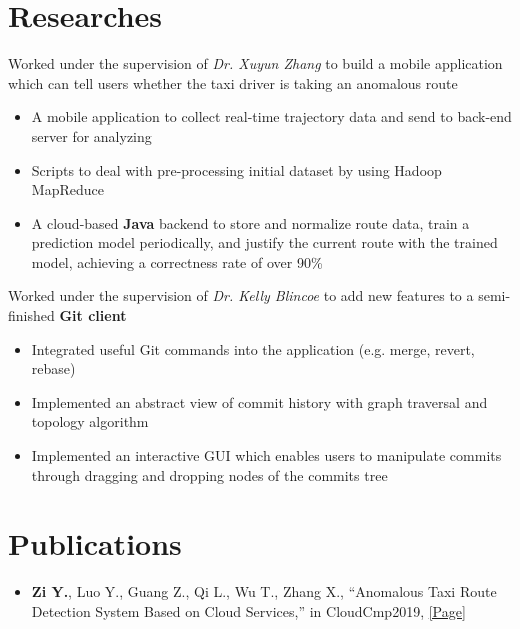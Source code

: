 \documentclass{resume}
\begin{document}
\section{Researches}
\begin{flushleft}
Worked under the supervision of \textit{Dr. Xuyun Zhang} to build a mobile application which can tell users whether \linebreak the taxi driver is taking an anomalous route
\begin{itemize}
    \item A mobile application to collect real-time trajectory data and send to back-end server for analyzing
    \item Scripts to deal with pre-processing initial dataset by using Hadoop MapReduce
    \item A cloud-based \textbf{Java} backend to store and normalize route data, train a prediction model periodically, \linebreak and justify the current route with the trained model, achieving a correctness rate of over 90\%
\end{itemize}
Worked under the supervision of \textit{Dr. Kelly Blincoe} to add new features to a semi-finished \textbf{Git client}
\begin{itemize}
    \item Integrated useful Git commands into the application (e.g. merge, revert, rebase)
    \item Implemented an abstract view of commit history with graph traversal and topology algorithm
    \item Implemented an interactive GUI which enables users to manipulate commits through dragging and \linebreak dropping nodes of the commits tree
\end{itemize}
\end{flushleft}

\section{Publications}
\begin{itemize}
    \item \textbf{Zi Y.}, Luo Y., Guang Z., Qi L., Wu T., Zhang X.,  ``Anomalous Taxi Route Detection System Based on Cloud Services,'' in CloudCmp2019, \href{https://doi.org/10.1007/978-3-030-48513-9_20}{[Page]}
\end{itemize}
\end{document}
